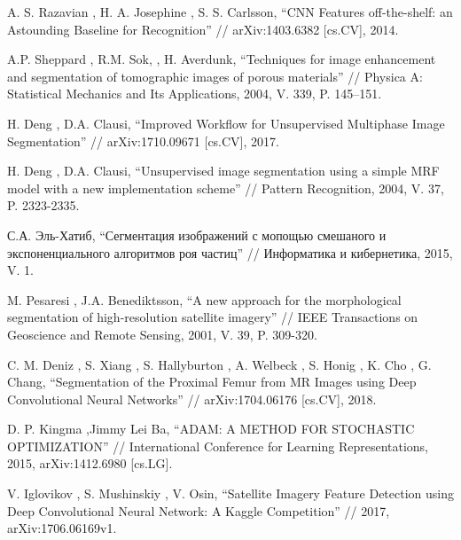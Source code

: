 \documentclass[12pt, a4paper]{extarticle}
\begin{document}
\begin{thebibliography}{99}
 A. S. Razavian
	, H. A. Josephine
	, S. S. Carlsson,
	``CNN Features off-the-shelf: an Astounding Baseline for Recognition'' // arXiv:1403.6382 [cs.CV], 2014.

 A.P. Sheppard
	, R.M. Sok,
	, H. Averdunk, ``Techniques for image enhancement and segmentation of tomographic images of porous materials'' // Physica A: Statistical Mechanics and Its Applications, 2004, V. 339, P. 145–151.

 H. Deng
	, D.A. Clausi, 
	``Improved Workflow for Unsupervised Multiphase Image Segmentation'' // arXiv:1710.09671 [cs.CV], 2017.

 H. Deng
	, D.A. Clausi, 
	``Unsupervised image segmentation using a simple MRF model with a new implementation scheme'' // 
Pattern Recognition, 2004, V. 37, P. 2323-2335.

 С.А. Эль-Хатиб,
	``Сегментация изображений с мопощью смешаного и экспоненциального алгоритмов роя частиц'' //
Информатика и кибернетика, 2015, V. 1.

  M. Pesaresi
	, J.A. Benediktsson,
	``A new approach for the morphological segmentation of high-resolution satellite imagery'' //
 IEEE Transactions on Geoscience and Remote Sensing, 2001, V. 39, P. 309-320.

  C. M. Deniz
	, S. Xiang
	, S. Hallyburton
	, A. Welbeck
	, S. Honig
	, K. Cho
	, G. Chang,
	``Segmentation of the Proximal Femur from MR Images using Deep Convolutional Neural Networks'' // arXiv:1704.06176 [cs.CV], 2018.

  D. P. Kingma
	,Jimmy Lei Ba,
	``ADAM: A METHOD FOR STOCHASTIC OPTIMIZATION'' // International Conference for Learning Representations, 2015, arXiv:1412.6980 [cs.LG].

  V. Iglovikov
	, S. Mushinskiy
	, V. Osin,
	``Satellite Imagery Feature Detection using
Deep Convolutional Neural Network: A Kaggle Competition'' //
 	2017, arXiv:1706.06169v1.

\end{thebibliography}
\end{document}
